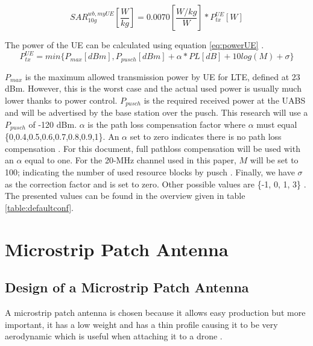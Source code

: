 \begin{equation} 
SAR^{wb,myUE}_{10g} \left[\frac{W}{kg}\right] = 0.0070 \left[\frac{W/kg}{W}\right] * P_{tx}^{UE} [W]
\label{eq:ulToSar}
\end{equation}

The power of the \gls{UE} can be calculated using equation \ref{eq:powerUE} \cite{J22_plets2015joint}.
\begin{equation} 
P_{tx}^{UE} = min \big\{P_{max} [dBm] , P_{pusch} [dBm] + \alpha * PL [dB] + 10log(M) + \sigma \big\}
\label{eq:powerUE}
\end{equation}

$P_{max}$ is the maximum allowed transmission power by \gls{UE} for LTE, defined at 23 dBm. 
However, this is the worst case and the actual used power is usually much lower thanks to power control.
$P_{pusch}$ is the required received power at the
\gls{UABS} and will be advertised by the base station over the \gls{pusch}. This research will use a
$P_{pusch}$ of -120 dBm. 
$\alpha$ is the path loss compensation factor where 
$\alpha$ must equal \{0,0.4,0.5,0.6,0.7,0.8,0.9,1\}. An $\alpha$ set to 
zero indicates there is no path loss compensation \cite{J32,J33}.
For this document, full pathloss compensation will be used with an $\alpha$ equal to one.
For the 20-MHz
channel used in this paper, $M$ will be set to 100; indicating the number of  used resource blocks by \gls{pusch} \cite{J22_plets2015joint}.
Finally, we have $\sigma$
 as the correction factor and is set to zero. Other possible values are \{-1, 0, 1, 3\} \cite{J22_plets2015joint,J32}.
 The presented values can be found in the overview given in table \ref{table:defaultconf}.

\section{Microstrip Patch Antenna}
\subsection{Design of  a Microstrip Patch Antenna}
\label{sub:definingAntenna}
A microstrip patch antenna is chosen because it allows easy production but more important, it has a low weight 
and has a thin profile causing it to be very aerodynamic which is useful when attaching it to a drone \cite{J13_microstripadvantages}.


